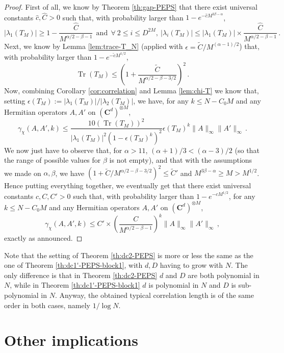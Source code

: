 \documentclass{amsart}
\newcommand{\C}{\mathbf{C}}
\renewcommand{\leq}{\leqslant}
\renewcommand{\geq}{\geqslant}
\DeclareMathOperator{\Tr}{Tr}
\begin{document}
\begin{proof}
    First of all, we know by Theorem \ref{th:gap-PEPS} that there exist universal constants $\hat{c},\hat{C}>0$ such that, with probability larger than $1-e^{-\hat{c}M^{3\beta-\alpha}}$,
    \[ |\lambda_1(T_M)|  \geq 1-\frac{\hat{C}}{M^{\alpha/2-\beta-1}}\ \ \text{and}\ \ \forall\ 2\leq i\leq D^{2M},\ |\lambda_i(T_M)| \leq |\lambda_1(T_M)|\times \frac{\hat{C}}{M^{\alpha/2-\beta-1}} \, . \]
    Next, we know by Lemma \ref{lem:trace-T_N} (applied with $\epsilon=\tilde{C}/M^{(\alpha-1)/2}$) that, with probability larger than $1-e^{-\tilde{c}M^{1/2}}$,
    \[ \Tr(T_M)\leq \left(1+\frac{\tilde{C}}{M^{\alpha/2-\beta-3/2}}\right)^2 \, . \]
    Now, combining Corollary \ref{cor:correlation} and Lemma \ref{lem:chi-T} we know that, setting $\epsilon(T_M):=|\lambda_1(T_M)|/|\lambda_2(T_M)|$, we have, for any $k\leq N-C_0M$ and any Hermitian operators $A,A'$ on $(\C^d)^{\otimes M}$,
    \[ \gamma_{\chi}(A,A',k) \leq \frac{10(\Tr(T_M))^2}{|\lambda_1(T_M)|^2\left(1-\epsilon(T_M)^k\right)^2} \epsilon(T_M)^k \|A\|_{\infty}\|A'\|_{\infty} \, .\]
    We now just have to observe that, for $\alpha>11$, $(\alpha+1)/3<(\alpha-3)/2$ (so that the range of possible values for $\beta$ is not empty), and that with the assumptions we made on $\alpha,\beta$, we have $\left(1+\tilde{C}/M^{\alpha/2-\beta-3/2}\right)^2\leq \tilde{C}'$ and $M^{3\beta-\alpha}\geq M>M^{1/2}$. Hence putting everything together, we eventually get that there exist universal constants $c,C, C'>0$ such that, with probability larger than $1-e^{-cM^{1/2}}$, for any $k\leq N-C_0M$ and any Hermitian operators $A,A'$ on $(\C^d)^{\otimes M}$,
    \[ \gamma_{\chi}(A,A',k) \leq C'\times\left(\frac{C}{M^{\alpha/2-\beta-1}}\right)^k\|A\|_{\infty}\|A'\|_{\infty} \, ,\]
    exactly as announced.
\end{proof}

Note that the setting of Theorem \ref{th:dc2-PEPS} is more or less the same as the one of Theorem \ref{th:dc1'-PEPS-block1}, with $d,D$ having to grow with $N$. The only difference is that in Theorem \ref{th:dc2-PEPS} $d$ and $D$ are both polynomial in $N$, while in Theorem \ref{th:dc1'-PEPS-block1} $d$ is polynomial in $N$ and $D$ is sub-polynomial in $N$. Anyway, the obtained typical correlation length is of the same order in both cases, namely $1/\log N$.

\section{Other implications}
\label{sec:implications}
\end{document}
